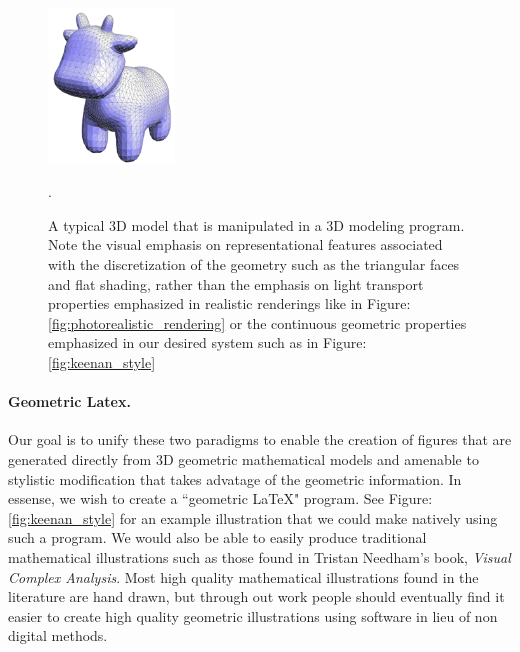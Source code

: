 \documentclass[12pt, letterpaper]{article}
\begin{document}
	\begin{figure}[h]
	\centering
	\includegraphics[width=0.3\textwidth]{KeenanCow}
	\caption{A typical 3D model that is manipulated in a 3D modeling program. Note the visual emphasis on representational features associated
			with the discretization of the geometry such as the triangular faces and flat shading, rather than the emphasis on light transport properties emphasized
			in realistic renderings like in Figure: \ref{fig:photorealistic_rendering} or the continuous geometric properties emphasized in our desired system such
			as in Figure: \ref{fig:keenan_style}}.
	\label{fig:keenan_cow}
	\end{figure}

	\paragraph{Geometric Latex.}

	Our goal is to unify these two paradigms to enable the creation of figures that are generated directly from 3D geometric mathematical models 
	and amenable to stylistic modification that takes advatage of the geometric information. In essense, we wish to create a ``geometric \LaTeX" program.
	See Figure: \ref{fig:keenan_style} for an example illustration that
	we could make natively using such a program. We would also be able to easily produce traditional mathematical illustrations such as those found in 
	Tristan Needham's book, \emph{Visual Complex Analysis}. Most high quality mathematical illustrations found in the literature are hand drawn,
	but through out work people should eventually find it easier to create high quality geometric illustrations using software in lieu of non digital methods.
\end{document}
